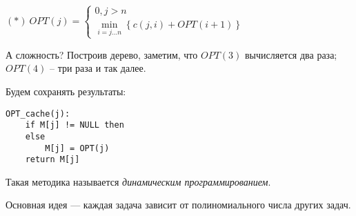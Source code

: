 $(*)\ OPT(j) =\begin{cases}
    0, j>n\\
    \min\limits_{i = j\ldots n}\left\{ c(j, i) + OPT(i+1) \right\}
\end{cases}$

А сложность? Построив дерево, заметим, что $OPT(3)$ вычисляется два раза; $OPT(4)$ -- три раза и так далее.

Будем сохранять результаты:

\begin{lstlisting}
OPT_cache(j):
    if M[j] != NULL then
    else
        M[j] = OPT(j)
    return M[j]
\end{lstlisting}

Такая методика называется \emph{динамическим программированием}.

Основная идея --- каждая задача зависит от полиномиального числа других задач.


